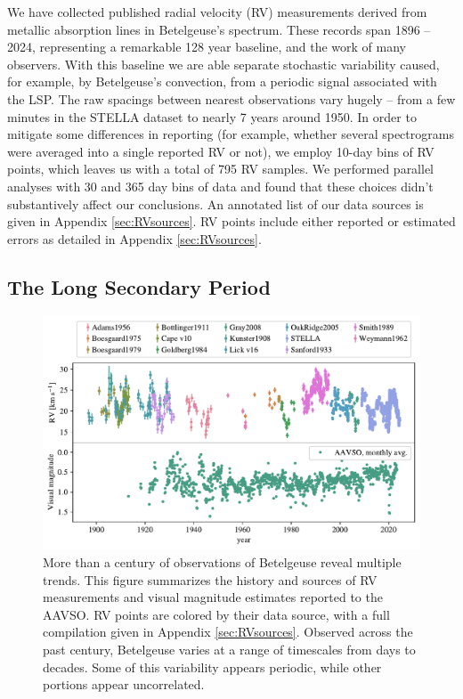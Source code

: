 \documentclass[twocolumn]{aastex631}
\begin{document}
We have collected published radial velocity (RV) measurements derived from metallic absorption lines in Betelgeuse’s spectrum. These records span 1896 – 2024, representing a remarkable 128 year baseline, and the work of many observers. With this baseline we are able separate stochastic variability caused, for example, by Betelgeuse's convection, from a periodic signal associated with the LSP.   The raw spacings between nearest observations vary hugely -- from a few minutes in the STELLA dataset to nearly 7 years around 1950. In order to mitigate some differences in reporting (for example, whether several spectrograms were averaged into a single reported RV or not), we employ 10-day bins of RV points, which leaves us with a total of 795 RV samples.  We performed parallel analyses with 30 and 365 day bins of data and found that these choices didn't substantively affect our conclusions. An annotated list of our data sources is given in Appendix \ref{sec:RVsources}. RV points include either reported or estimated errors as detailed in  Appendix \ref{sec:RVsources}.



\subsection{The Long Secondary Period}

\begin{figure}
    \centering
    \includegraphics[width=\textwidth]{figures/rv_aavso_summary.pdf}
    \caption{More than a century of observations of Betelgeuse reveal multiple trends. This figure summarizes the history and sources of RV measurements and visual magnitude estimates reported to the AAVSO. RV points are colored by their data source, with a full compilation given in Appendix \ref{sec:RVsources}. Observed across the past century, Betelgeuse varies at a range of timescales from days to decades. Some of this variability appears periodic, while other portions appear uncorrelated. }
    \label{fig:rvsummary}
\end{figure}
\end{document}
